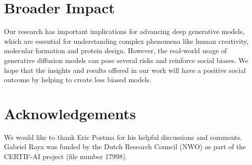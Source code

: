 \documentclass{article}
\begin{document}
 

\section*{Broader Impact}
Our research has important implications for advancing deep generative models, which are essential for understanding complex phenomena like human creativity, molecular formation and protein design.  However, the real-world usage of generative diffusion models can pose several risks and reinforce social biases. We hope that the insights and results offered in our work will have a positive social outcome by helping to create less biased models.

\section{Acknowledgements}
We would like to thank Eric Postma for his helpful discussions and comments. Gabriel Raya was funded by the Dutch Research Council (NWO) as part of the CERTIF-AI project (file number 17998).






 
\newpage

\end{document}
